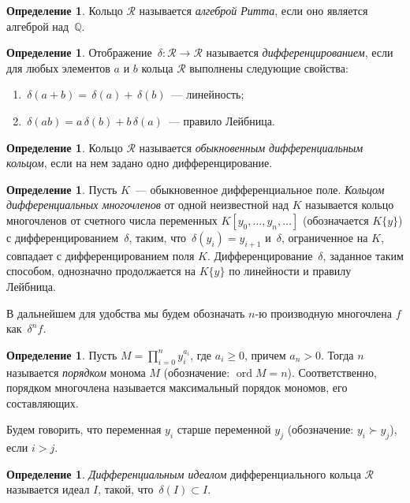 \documentclass[11pt]{article}
\DeclareMathOperator{\ord}{ord}
\renewcommand{\ge}{\geqslant}
\theoremstyle{plain1}
\theoremstyle{plain2}
\theoremstyle{plain}
\theoremstyle{plain3}
\theoremstyle{definition}
\newtheorem{definition}[theorem2]{Определение}
\theoremstyle{remark}
\begin{document}
\begin{definition}
Кольцо $\mathcal{R}$ называется \emph{алгеброй Ритта}, если оно является алгеброй над~$\mathbb{Q}$.
\end{definition}

\begin{definition}
Отображение $\,\delta: \mathcal{R} \to \mathcal{R}$ называется \emph{дифференцированием}, если для любых элементов $a$ и $b$ кольца $\mathcal{R}$
выполнены следующие свойства:
\begin{enumerate}
  \item $\,\delta(a+b)= \,\delta(a)+\,\delta(b)$~--– линейность;
  \item $\,\delta(ab)=a\,\delta(b)+b\,\delta(a)$~--- правило Лейбница.
\end{enumerate}
\end{definition}

\begin{definition}
Кольцо $\mathcal{R}$ называется \emph{обыкновенным дифференциальным кольцом}, если на нем задано одно дифференцирование.
\end{definition}

\begin{definition}
Пусть $K$~--- обыкновенное дифференциальное поле.
\emph{Кольцом дифференциальных многочленов} от одной неизвестной над $K$
называется кольцо многочленов от счетного числа переменных ${K}[y_0,\ldots,y_n,\ldots]$
(обозначается ${K}\{y\}$)
с дифференцированием $\,\delta$, таким, что $\,\delta(y_i)=y_{i+1}$ и $\,\delta$, ограниченное на ${K}$, совпадает с дифференцированием поля $K$. Дифференцирование $\,\delta$, заданное таким способом, однозначно продолжается на $K\{y\}$ по линейности и правилу Лейбница.
\end{definition}

В дальнейшем для удобства мы будем обозначать $n$-ю производную многочлена $f$ как $\,\delta^n f$.

\begin{definition}
Пусть $M = \prod\limits_{i=0}^ny_i^{a_i}$, где $a_i \ge 0$, причем $a_n > 0$. Тогда $n$ называется \emph{порядком} монома $M$ (обозначение: $\ord M=n$). Соответственно, порядком многочлена называется максимальный порядок
мономов, его составляющих.
\end{definition}

Будем говорить, что переменная $y_i$ старше переменной $y_j$ (обозначение: $y_i \succ y_j$), если $i>j$.

\begin{definition}
\emph{Дифференциальным идеалом} дифференциального кольца $\mathcal{R}$ называется идеал $I$, такой, что $\,\delta(I)\subset I$.
\end{definition}
\end{document}
